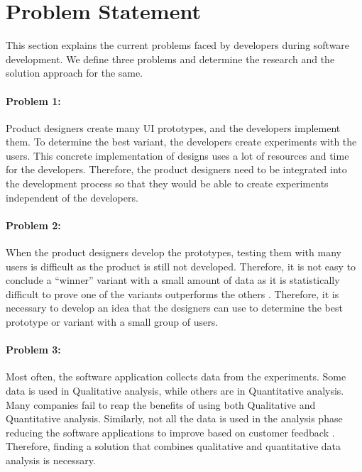 \section{Problem Statement}
\label{intro:section:problems}
This section explains the current problems faced by developers during software development. 
We define three problems and determine the research and the solution approach for the same.

\paragraph{Problem 1:} Product designers create many UI prototypes, and the developers implement them.
To determine the best variant, the developers create experiments with the users. 
This concrete implementation of designs uses a lot of resources and time for the developers.
Therefore, the product designers need to be integrated into the development process so that they would be able to create experiments independent of the developers.


\paragraph{Problem 2:} When the product designers develop the prototypes, testing them with many users is difficult as the product is still not developed.
Therefore, it is not easy to conclude a ``winner'' variant with a small amount of data as it is statistically difficult to prove one of the variants outperforms the others \cite{article:usability:smalldata}.
Therefore, it is necessary to develop an idea that the designers can use to determine the best prototype or variant with a small group of users.

\paragraph{Problem 3:} Most often, the software application collects data from the experiments. 
Some data is used in Qualitative analysis, while others are in Quantitative analysis.
Many companies fail to reap the benefits of using both Qualitative and Quantitative analysis.
Similarly, not all the data is used in the analysis phase reducing the software applications to improve based on customer feedback \cite{article:datadrive:brian}.
Therefore, finding a solution that combines qualitative and quantitative data analysis is necessary.

